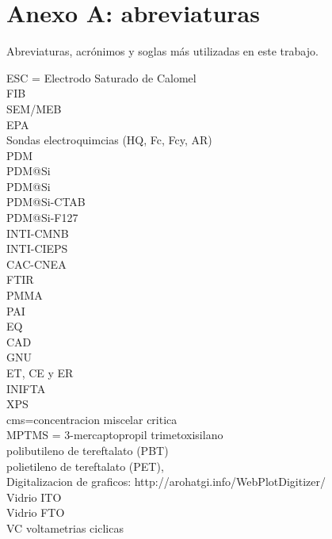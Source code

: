 \FormatoAnexo

\AddLabelsAxUno

\chapter*{Anexo A: abreviaturas}

	\noindent Abreviaturas, acrónimos y soglas más utilizadas en este trabajo.

	\noindent ESC = Electrodo Saturado de Calomel \\
    FIB\\
    SEM/MEB\\
    EPA \\
    Sondas electroquimcias (HQ, Fc, Fcy, AR)\\
    PDM\\
    PDM@Si\\
    PDM@Si\\
    PDM@Si-CTAB\\
    PDM@Si-F127\\
    INTI-CMNB\\
    INTI-CIEPS\\
    CAC-CNEA\\
    FTIR\\
    PMMA\\
    PAI\\
    EQ\\
    CAD\\
    GNU\\
    ET, CE y ER\\
    INIFTA\\
    XPS\\
    cms=concentracion miscelar critica\\
    MPTMS = 3-mercaptopropil trimetoxisilano\\
    polibutileno de tereftalato (PBT)\\
    polietileno de tereftalato (PET),\\
    Digitalizacion de graficos: http://arohatgi.info/WebPlotDigitizer/\\
    Vidrio ITO\\
    Vidrio FTO\\
    VC voltametrias ciclicas\\

\thispagestyle{backmatter}